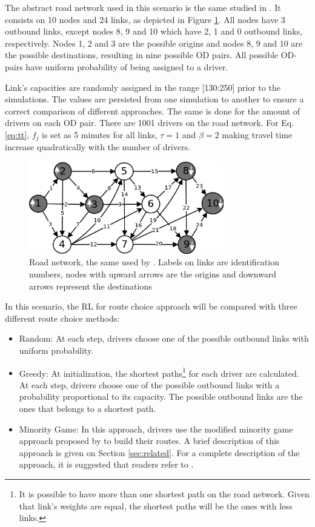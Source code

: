 \documentclass{RITA}
\newcommand{\fftt}{\ensuremath{f_j}} 		%
\begin{document}
The abstract road network used in this scenario is the same studied in \cite{Galib&Moser2011}. It consists on 10 nodes and 24 links, as depicted in Figure \ref{fig:roadnetwork}. All nodes have 3 outbound links, except nodes 8, 9 and 10 which have 2, 1 and 0 outbound links, respectively. Nodes 1, 2 and 3 are the possible origins and nodes 8, 9 and 10 are the possible destinations, resulting in nine possible OD pairs. All possible OD-pairs have uniform probability of being assigned to a driver.

Link's capacities are randomly assigned in the range [130:250] prior to the simulations. The values are persisted from one simulation to another to ensure a correct comparison of different approaches. The same is done for the amount of drivers on each OD pair. There are 1001 drivers on the road network. For Eq. \eqref{eq:tt}, $\fftt$ is set as 5 minutes for all links, $\tau = 1$ and $\beta = 2$ making travel time increase quadratically with the number of drivers.

\begin{figure}[ht]
    \centerline{\includegraphics[width=8.5cm]{img/roadnetwork.png}}
    \caption{Road network, the same used by \cite{Galib&Moser2011}. Labels on links are identification numbers, nodes with upward arrows are the origins and downward arrows represent the destinations}
    \label{fig:roadnetwork}
\end{figure}

In this scenario, the RL for route choice approach will be compared with three different route choice methods:

\begin{itemize}
  \item Random: At each step, drivers choose one of the possible outbound links with uniform probability.
  \item Greedy: At initialization, the shortest paths\footnote{It is possible to have more than one shortest path on the road network. Given that link's weights are equal, the shortest paths will be the ones with less links.} for each driver are calculated. At each step, drivers choose one of the possible outbound links with a probability proportional to its capacity. The possible outbound links are the ones that belongs to a shortest path. %
  \item Minority Game: In this approach, drivers use the modified minority game approach proposed by \cite{Galib&Moser2011} to build their routes. A brief description of this approach is given on Section \ref{sec:related}. For a complete description of the approach, it is suggested that readers refer to \cite{Galib&Moser2011}.
\end{itemize}
\end{document}
